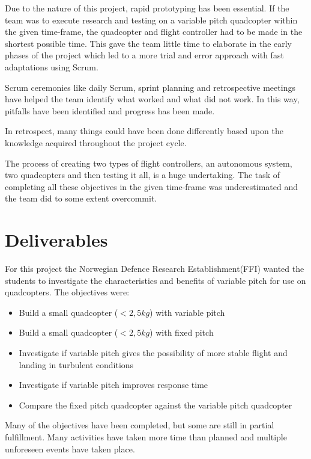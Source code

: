 Due to the nature of this project, rapid prototyping has been essential. If the team was to execute research and testing on a variable pitch quadcopter within the given time-frame, the quadcopter and flight controller had to be made in the shortest possible time. This gave the team little time to elaborate in the early phases of the project which led to a more trial and error approach with fast adaptations using Scrum. \bigskip

Scrum ceremonies like daily Scrum, sprint planning and retrospective meetings have helped the team identify what worked and what did not work. In this way, pitfalls have been identified and progress has been made.\bigskip

In retrospect, many things could have been done differently based upon the knowledge acquired throughout the project cycle. \bigskip

The process of creating two types of flight controllers, an autonomous system, two quadcopters and then testing it all, is a huge undertaking. The task of completing all these objectives in the given time-frame was underestimated and the team did to some extent overcommit.

\clearpage

\section{Deliverables} 

For this project the Norwegian Defence Research Establishment(FFI) wanted the students to investigate the characteristics and benefits of variable pitch for use on quadcopters. The objectives were:

\begin{itemize}
    \item Build a small quadcopter ($<2,5 kg$) with variable pitch 
    \item Build a small quadcopter ($<2,5 kg$) with fixed pitch
    \item Investigate if variable pitch gives the possibility of more stable flight and landing in turbulent conditions
    \item Investigate if variable pitch improves response time
    \item Compare the fixed pitch quadcopter against the variable pitch quadcopter
\end{itemize}

Many of the objectives have been completed, but some are still in partial fulfillment. Many activities have taken more time than planned and multiple unforeseen events have taken place. \\

